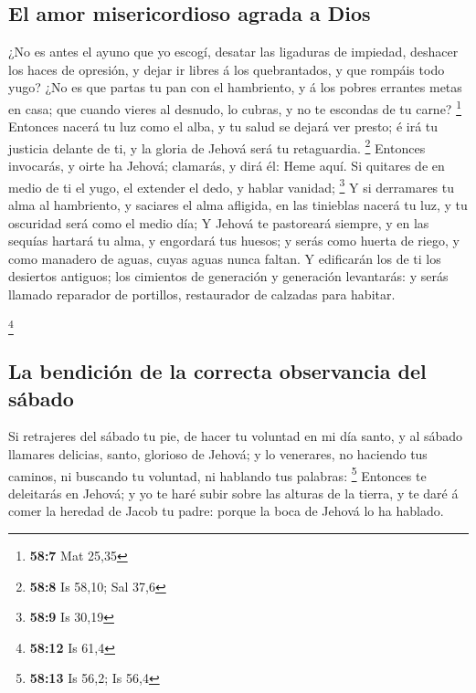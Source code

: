 \hypertarget{el-amor-misericordioso-agrada-a-dios}{%
\subsection{El amor misericordioso agrada a
Dios}\label{el-amor-misericordioso-agrada-a-dios}}

 ¿No es antes el ayuno que yo escogí, desatar las
ligaduras de impiedad, deshacer los haces de opresión, y dejar ir libres
á los quebrantados, y que rompáis todo yugo?  ¿No es que
partas tu pan con el hambriento, y á los pobres errantes metas en casa;
que cuando vieres al desnudo, lo cubras, y no te escondas de tu carne?
\footnote{\textbf{58:7} Mat 25,35}  Entonces nacerá tu luz
como el alba, y tu salud se dejará ver presto; é irá tu justicia delante
de ti, y la gloria de Jehová será tu retaguardia. \footnote{\textbf{58:8}
  Is 58,10; Sal 37,6}  Entonces invocarás, y oirte ha
Jehová; clamarás, y dirá él: Heme aquí. Si quitares de en medio de ti el
yugo, el extender el dedo, y hablar vanidad; \footnote{\textbf{58:9} Is
  30,19}  Y si derramares tu alma al hambriento, y
saciares el alma afligida, en las tinieblas nacerá tu luz, y tu
oscuridad será como el medio día;  Y Jehová te pastoreará
siempre, y en las sequías hartará tu alma, y engordará tus huesos; y
serás como huerta de riego, y como manadero de aguas, cuyas aguas nunca
faltan.  Y edificarán los de ti los desiertos antiguos;
los cimientos de generación y generación levantarás: y serás llamado
reparador de portillos, restaurador de calzadas para habitar.

\footnote{\textbf{58:12} Is 61,4}

\hypertarget{la-bendiciuxf3n-de-la-correcta-observancia-del-suxe1bado}{%
\subsection{La bendición de la correcta observancia del
sábado}\label{la-bendiciuxf3n-de-la-correcta-observancia-del-suxe1bado}}

 Si retrajeres del sábado tu pie, de hacer tu voluntad en
mi día santo, y al sábado llamares delicias, santo, glorioso de Jehová;
y lo venerares, no haciendo tus caminos, ni buscando tu voluntad, ni
hablando tus palabras: \footnote{\textbf{58:13} Is 56,2; Is 56,4}
 Entonces te deleitarás en Jehová; y yo te haré subir
sobre las alturas de la tierra, y te daré á comer la heredad de Jacob tu
padre: porque la boca de Jehová lo ha hablado.


